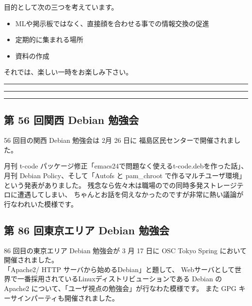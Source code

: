 \documentclass[mingoth,a4paper]{jsarticle}
\begin{document}
 目的として次の三つを考えています。
 \begin{itemize}
  \item MLや掲示板ではなく、直接顔を合わせる事での情報交換の促進
  \item 定期的に集まれる場所
  \item 資料の作成
 \end{itemize}

 それでは、楽しい一時をお楽しみ下さい。

\newpage

\begin{minipage}[b]{0.2\hsize}
 {}
\end{minipage}
\begin{minipage}[b]{0.8\hsize}
\hrule
\vspace{2mm}
\hrule
\setcounter{tocdepth}{1}
\tableofcontents
\vspace{2mm}
\hrule
\end{minipage}


\subsection{第 56 回関西 Debian 勉強会}
56 回目の関西 Debian 勉強会は 2月 26 日に
福島区民センターで開催されました。

月刊 t-code パッケージ修正「emacs24で問題なく使えるt-code.debを作った話」、
月刊 Debian Policy、そして「Autofs と pam\_chroot で作るマルチユーザ環境」という発表がありました。
残念なら佐々木は職場のでの同時多発ストレージテロに遭遇してしまい、
ちゃんとお話を伺えなかったのですが非常に熱い議論が行なわれいた模様です。

\subsection{第 86 回東京エリア Debian 勉強会}
86 回目の東京エリア Debian 勉強会が 3 月 17 日に
OSC Tokyo Spring において開催されました。\\
「Apache2/ HTTP サーバから始めるDebian」と題して、
Webサーバとして世界で一番採用されているLinuxディストリビューションである Debian の Apache2 について、「ユーザ視点の勉強会」が行なわた模様です。
また GPG キーサインパーティも開催されました。

\clearpage

\end{document}
